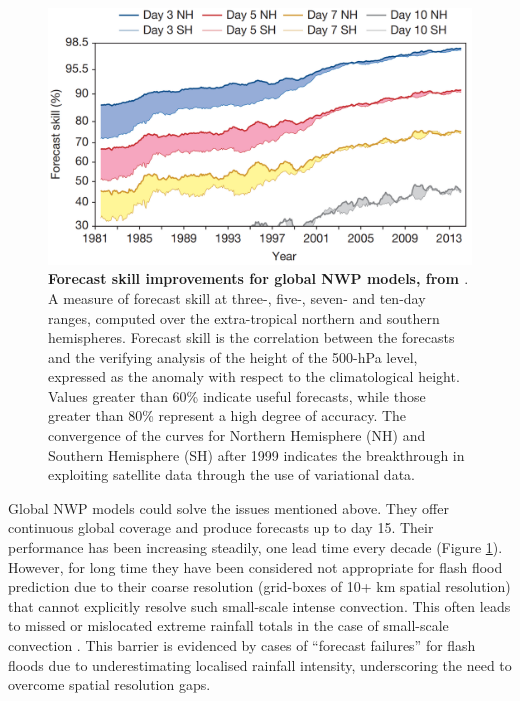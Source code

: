 \begin{figure}[htbp]
\centering
\includegraphics[width=\textwidth]{improvement_forecast_skill.png}
\caption{\textbf{Forecast skill improvements for global NWP models, from \citet{Bauer_2015}}. A measure of forecast skill at three-, five-, seven- and ten-day ranges, computed over the extra-tropical northern and southern hemispheres. Forecast skill is the correlation between the forecasts and the verifying analysis of the height of the 500-hPa level, expressed as the anomaly with respect to the climatological height. Values greater than 60\% indicate useful forecasts, while those greater than 80\% represent a high degree of accuracy. The convergence of the curves for Northern Hemisphere (NH) and Southern Hemisphere (SH) after 1999 indicates the breakthrough in exploiting satellite data through the use of variational data.}
\label{fig:improvement_forecast_skill}
\end{figure}

Global NWP models could solve the issues mentioned above. They offer continuous global coverage and produce forecasts up to day 15. Their performance has been increasing steadily, one lead time every decade (Figure \ref{fig:improvement_forecast_skill}). However, for long time they have been considered not appropriate for flash flood prediction due to their coarse resolution (grid-boxes of 10+ km spatial resolution) that cannot explicitly resolve such small-scale intense convection. This often leads to missed or mislocated extreme rainfall totals in the case of small-scale convection \citep{Schumacher_2017}. This barrier is evidenced by cases of “forecast failures” for flash floods due to underestimating localised rainfall intensity, underscoring the need to overcome spatial resolution gaps. 

